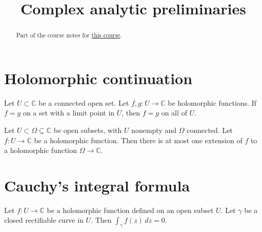 \documentclass[reqno]{amsart} 
\begin{document}
\usepackage{xr-hyper}


\title{Complex analytic preliminaries}
\begin{abstract}
  Part of the course notes for \href{2023-introduction-to-zeta-and-l-functions.pdf}{this course}.
\end{abstract}

\section{Holomorphic continuation}

\begin{theorem}
  Let $U \subset \mathbb{C} $ be a connected open set.  Let $f, g : U \rightarrow \mathbb{C} $ be holomorphic functions.  If $f = g$ on a set with a limit point in $U$, then $f = g$ on all of $U$.
\end{theorem}
\begin{corollary}\label{corollary:cj3vqbthht}
  Let $U \subset \Omega \subseteq \mathbb{C} $ be open subsets, with $U$ nonempty and $\Omega$ connected.  Let $f : U \rightarrow \mathbb{C}$ be a holomorphic function.  Then there is at most one extension of $f$ to a holomorphic function $\Omega \rightarrow \mathbb{C}$.
\end{corollary}

\section{Cauchy's integral formula}
\begin{theorem}
  Let $f : U \rightarrow \mathbb{C} $ be a holomorphic function defined on an open subset $U$.  Let $\gamma$ be a closed rectifiable curve in $U$.  Then $\int_\gamma f(z) \, d z = 0$.
\end{theorem}
\end{document}
